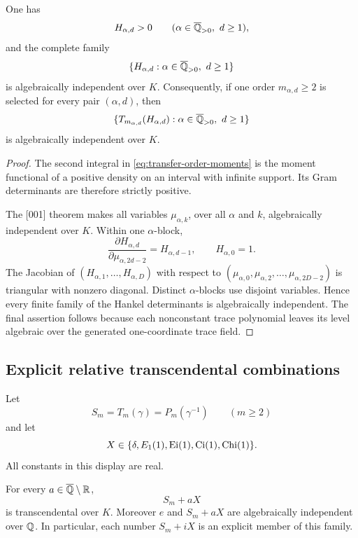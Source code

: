 \begin{theorem}
\label{thm:transfer-order-hankel}
One has
\[
 H_{\alpha,d}>0
 \qquad(\alpha\in\overline{\mathbb Q}_{>0},\ d\ge1),
\]
and the complete family
\[
 \{H_{\alpha,d}:\alpha\in\Qbar_{>0},\ d\ge1\}
\]
is algebraically independent over \(K\).  Consequently, if one order
\(m_{\alpha,d}\ge2\) is selected for every pair \((\alpha,d)\), then
\[
 \{T_{m_{\alpha,d}}(H_{\alpha,d}):
   \alpha\in\overline{\mathbb Q}_{>0},\ d\ge1\}
\]
is algebraically independent over \(K\).
\end{theorem}

\begin{proof}
The second integral in \eqref{eq:transfer-order-moments} is the moment
functional of a positive density on an interval with infinite support.
Its Gram determinants are therefore strictly positive.

The [001] theorem makes all variables \(\mu_{\alpha,k}\), over all
\(\alpha\) and \(k\), algebraically independent over \(K\).  Within one
\(\alpha\)-block,
\[
 \frac{\partial H_{\alpha,d}}
      {\partial\mu_{\alpha,2d-2}}=H_{\alpha,d-1},
 \qquad H_{\alpha,0}=1.
\]
The Jacobian of \((H_{\alpha,1},\ldots,H_{\alpha,D})\) with respect to
\((\mu_{\alpha,0},\mu_{\alpha,2},\ldots,
\mu_{\alpha,2D-2})\) is triangular with nonzero diagonal.  Distinct
\(\alpha\)-blocks use disjoint variables.  Hence every finite family of
the Hankel determinants is algebraically independent.  The final assertion
follows because each nonconstant trace polynomial leaves its level algebraic
over the generated one-coordinate trace field.
\end{proof}

\subsection{Explicit relative transcendental combinations}

Let
\[
 S_m=T_m(\gamma)=P_m(\gamma^{-1})\qquad(m\ge2)
\]
and let
\[
 X\in\{\delta,E_1(1),\operatorname{Ei}(1),\operatorname{Ci}(1),\operatorname{Chi}(1)\}.
\]
All constants in this display are real.

\begin{theorem}
\label{thm:transfer-complex-combinations}
For every \(a\in\overline{\mathbb Q}\setminus\mathbb R\),
\[
 S_m+aX
\]
is transcendental over \(K\).  Moreover \(e\) and \(S_m+aX\) are
algebraically independent over \(\mathbb Q\).  In particular, each number
\(S_m+iX\) is an explicit member of this family.
\end{theorem}

